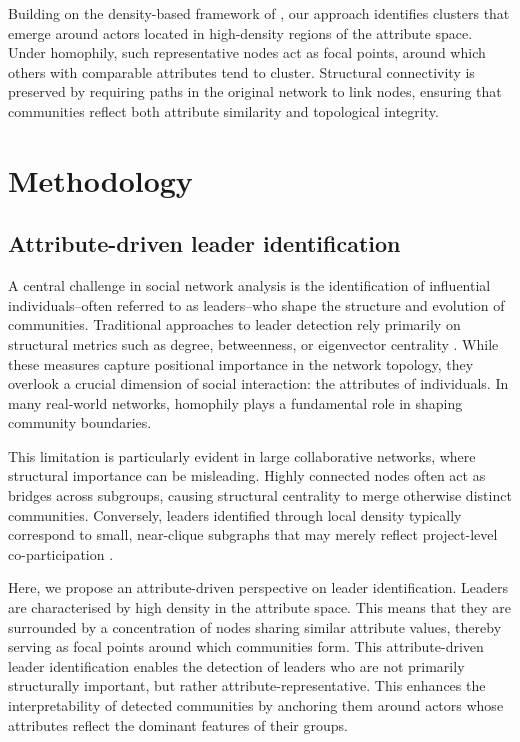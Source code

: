 \documentclass[11pt]{article}
\begin{document}
Building on the density-based framework of \cite{Menardi2022Density-basedNetworks}, our approach identifies clusters that emerge around actors located in high-density regions of the attribute space. Under homophily, such representative nodes act as focal points, around which others with comparable attributes tend to cluster. Structural connectivity is preserved by requiring paths in the original network to link nodes, ensuring that communities reflect both attribute similarity and topological integrity.

\section{Methodology}\label{sec:method}

\subsection{Attribute-driven leader identification}\label{subsec:leader_ident}

A central challenge in social network analysis is the identification of influential individuals--often referred to as leaders--who shape the structure and evolution of communities. Traditional approaches to leader detection rely primarily on structural metrics such as degree, betweenness, or eigenvector centrality \citep{Newman2010}. While these measures capture positional importance in the network topology, they overlook a crucial dimension of social interaction: the attributes of individuals. In many real-world networks, homophily plays a fundamental role in shaping community boundaries.

This limitation is particularly evident in large collaborative networks, where structural importance can be misleading. Highly connected nodes often act as bridges across subgroups, causing structural centrality to merge otherwise distinct communities. Conversely, leaders identified through local density typically correspond to small, near-clique subgraphs that may merely reflect project-level co-participation \citep{Menardi2022Density-basedNetworks}.

Here, we propose an attribute-driven perspective on leader identification. Leaders are characterised by high density in the attribute space. This means that they are surrounded by a concentration of nodes sharing similar attribute values, thereby serving as focal points around which communities form.
This attribute-driven leader identification enables the detection of leaders who are not primarily structurally important, but rather attribute-representative. This enhances the interpretability of detected communities by anchoring them around actors whose attributes reflect the dominant features of their groups. 
\end{document}
